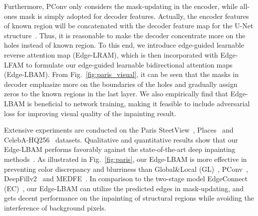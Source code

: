 \documentclass[10pt,journal,compsoc]{IEEEtran}
\begin{document}
Furthermore, PConv only considers the mask-updating in the encoder, while all-ones mask is simply adopted for decoder features.
%
Actually, the encoder features of known region will be concatenated with the decoder feature map for the U-Net structure~\cite{UNetRFB15a}.
%
Thus, it is reasonable to make the decoder concentrate more on the holes instead of known region.
%
To this end, we introduce edge-guided learnable reverse attention map (Edge-LRAM), which is then incorporated with Edge-LFAM to formulate our edge-guided learnable bidirectional attention maps (Edge-LBAM).
%
From Fig.~\ref{fig:paris_visual}, it can be seen that the masks in decoder emphasize more on the boundaries of the holes and gradually assign zeros to the known regions in the last layer.
%
We also empirically find that Edge-LBAM is beneficial to network training, making it feasible to include adversarial loss for improving visual quality of the inpainting result.




Extensive experiments are conducted on the Paris SteetView~\cite{doersch2015makes}, Places~\cite{zhou2017places} and CelebA-HQ256~\cite{karras2017progressive} datasets.
%
Qualitative and quantitative results show that our Edge-LBAM performs favorably against the state-of-the-art deep inpainting methods~\cite{IizukaGL,partialconv2017,yu2018free,nazeri2019edgeconnect,liu2020rethinking}.
%
As illustrated in Fig.~\ref{fig:paris}, our Edge-LBAM is more effective in preventing
color discrepancy and blurriness than Global\&Local (GL)~\cite{IizukaGL}, PConv~\cite{partialconv2017}, DeepFillv2~\cite{yu2018free} {and MEDFE~\cite{liu2020rethinking}}.
%
In comparison to the two-stage model EdgeConnect (EC)~\cite{nazeri2019edgeconnect}, our Edge-LBAM can utilize the predicted edges in mask-updating, and gets decent performance on the inpainting of structural regions while avoiding the interference of background pixels.


%
%
\end{document}
